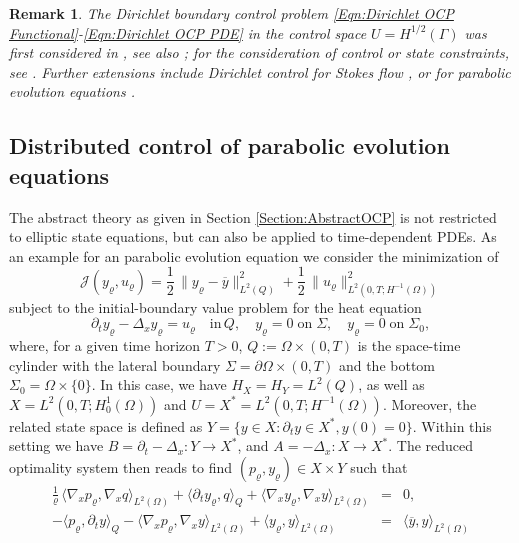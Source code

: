 \documentclass{article}
\newtheorem{remark}{Remark}
\numberwithin{equation}{section}
\begin{document}
\begin{remark}
  The Dirichlet boundary control problem
  \eqref{Eqn:Dirichlet OCP Functional}-\eqref{Eqn:Dirichlet OCP PDE}
  in the control space $U=H^{1/2}(\Gamma)$ was first considered in
  \cite{OfPhanSteinbach:2015}, see also
  \cite{ChowdhuryGudiNandakumaran:2017,GongLiuTanYan:2019,Winkler:2020};
  for the consideration of control or state constraints, see
  \cite{GanglLoescherSteinbach2025CAMWA,GongTan2025JSC,GudiSau:2020}.
  Further extensions include Dirichlet control for Stokes flow
  \cite{GongMateosSinglerZhang:2022}, or for parabolic evolution
  equations \cite{GudiMallikSau:2022}.
\end{remark}

%
%
\subsection{Distributed control of parabolic evolution equations}
%
The abstract theory as given in Section \ref{Section:AbstractOCP}
is not restricted to elliptic state equations, 
but can also be applied to time-dependent PDEs.
As an example for an parabolic evolution equation 
we consider the minimization of
\[
  {\mathcal{J}}(y_\varrho,u_\varrho) =
  \frac{1}{2} \, \| y_\varrho - \overline{y} \|_{L^2(Q)}^2 +
  \frac{1}{2} \, \| u_\varrho \|^2_{L^2(0,T;H^{-1}(\Omega))}
\]
subject to the 
initial-boundary value
problem for the heat equation
\[
  \partial_t y_\varrho - \Delta_x y_\varrho = u_\varrho \quad
  \mbox{in} \, Q, \quad y_\varrho = 0 \; \mbox{on} \; \Sigma, \quad
  y_\varrho = 0 \; \mbox{on} \; \Sigma_0,
\]
where, for a given time horizon $T>0$,
$Q:=\Omega \times (0,T)$ is the space-time cylinder  
with the lateral boundary $\Sigma = \partial \Omega \times (0,T)$ 
and the bottom $\Sigma_0 = \Omega \times \{0\}$. 
In this case, we have
$H_X = H_Y = L^2(Q)$, as well as
$X = L^2(0,T;H^1_0(\Omega))$ and $U = X^* = L^2(0,T;H^{-1}(\Omega))$.
Moreover, the related state space is defined as
$Y = \{ y \in X : \partial_t y \in X^*, y(0)=0 \}$. Within this setting
we have $B = \partial_t - \Delta_x : Y \to X^*$, and
$A = - \Delta_x : X \to X^*$. The reduced optimality system then reads
to find $(p_\varrho,y_\varrho) \in X \times Y$ such that
\begin{eqnarray*}
  \frac{1}{\varrho} \, \langle \nabla_x p_\varrho ,
  \nabla_x q \rangle_{L^2(\Omega)} + \langle \partial_t y_\varrho , q \rangle_Q
  + \langle \nabla_x y_\varrho , \nabla_x y \rangle_{L^2(\Omega)}
  & = & 0, \\
  - \langle p_\varrho , \partial_t y \rangle_Q -
  \langle \nabla_x p_\varrho , \nabla_x y \rangle_{L^2(\Omega)} +
  \langle y_\varrho , y \rangle_{L^2(\Omega)}
  & = & \langle \overline{y} , y \rangle_{L^2(\Omega)}
\end{eqnarray*}
\end{document}
